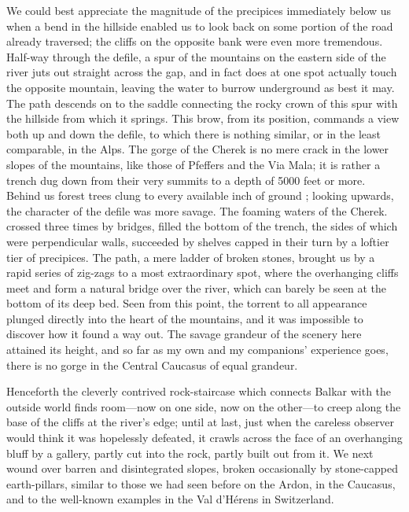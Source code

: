 \documentclass[25pt, a4paper]{article}
\begin{document}
	We could best appreciate the magnitude of the precipices immediately below us when a bend in the hillside enabled us to look back on some portion of the road already traversed; the cliffs on the opposite bank were even more tremendous. Half-way through the defile, a spur of the mountains on the eastern side of the river juts out straight across the gap, and in fact does at one spot actually touch the opposite mountain, leaving the water to burrow underground as best it may. The path descends on to the saddle connecting the rocky crown of this spur with the hillside from which it springs. This brow, from its position, commands a view both up and down the defile, to which there is nothing similar, or in the least comparable, in the Alps. The gorge of the Cherek is no mere crack in the lower slopes of the mountains, like those of Pfeffers and the Via Mala; it is rather a trench dug down from their very summits to a depth of 5000 feet or more. Behind us forest trees clung to every available inch of ground ; looking upwards, the character of the defile was more savage. The foaming waters of the Cherek. crossed three times by bridges, filled the bottom of the trench, the sides of which were perpendicular walls, succeeded by shelves capped in their turn by a loftier tier of precipices. The path, a mere ladder of broken stones, brought us by a rapid series of zig-zags to a most extraordinary spot, where the overhanging cliffs meet and form a natural bridge over the river, which can barely be seen at the bottom of its deep bed. Seen from this point, the torrent to all appearance plunged directly into the heart of the mountains, and it was impossible to discover how it found a way out. The savage grandeur of the scenery here attained its height, and so far as my own and my companions' experience goes, there is no gorge in the Central Caucasus of equal grandeur.
	
	Henceforth the cleverly contrived rock-staircase which connects Balkar with the outside world finds room—now on one side, now on the other—to creep along the base of the cliffs at the river's edge; until at last, just when the careless observer would think it was hopelessly defeated, it crawls across the face of an overhanging bluff by a gallery, partly cut into the rock, partly built out from it. We next wound over barren and disintegrated slopes, broken occasionally by stone-capped earth-pillars, similar to those we had seen before on the Ardon, in the Caucasus, and to the well-known examples in the Val d'Hérens in Switzerland.
	
\end{document}
